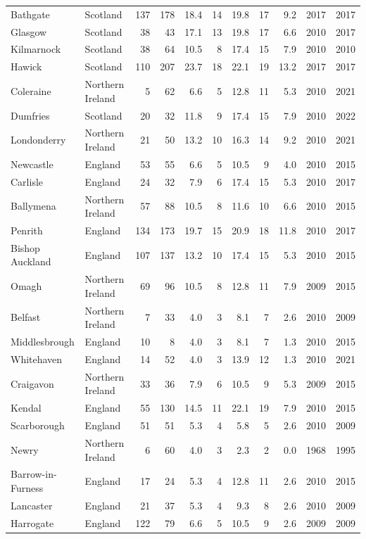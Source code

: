 \documentclass[11pt,a4paper]{article}
\begin{document}
{\begin{longtable}{llrrrrrrrrr}
Bathgate & Scotland & 137 & 178 & 18.4 & 14 & 19.8 & 17 & 9.2 & 2017 & 2017\\
Glasgow & Scotland & 38 & 43 & 17.1 & 13 & 19.8 & 17 & 6.6 & 2010 & 2017\\
Kilmarnock & Scotland & 38 & 64 & 10.5 & 8 & 17.4 & 15 & 7.9 & 2010 & 2010\\
Hawick & Scotland & 110 & 207 & 23.7 & 18 & 22.1 & 19 & 13.2 & 2017 & 2017\\
Coleraine & Northern Ireland & 5 & 62 & 6.6 & 5 & 12.8 & 11 & 5.3 & 2010 & 2021\\
Dumfries & Scotland & 20 & 32 & 11.8 & 9 & 17.4 & 15 & 7.9 & 2010 & 2022\\
Londonderry & Northern Ireland & 21 & 50 & 13.2 & 10 & 16.3 & 14 & 9.2 & 2010 & 2021\\
Newcastle & England & 53 & 55 & 6.6 & 5 & 10.5 & 9 & 4.0 & 2010 & 2015\\
Carlisle & England & 24 & 32 & 7.9 & 6 & 17.4 & 15 & 5.3 & 2010 & 2017\\
Ballymena & Northern Ireland & 57 & 88 & 10.5 & 8 & 11.6 & 10 & 6.6 & 2010 & 2015\\
Penrith & England & 134 & 173 & 19.7 & 15 & 20.9 & 18 & 11.8 & 2010 & 2017\\
Bishop Auckland & England & 107 & 137 & 13.2 & 10 & 17.4 & 15 & 5.3 & 2010 & 2015\\
Omagh & Northern Ireland & 69 & 96 & 10.5 & 8 & 12.8 & 11 & 7.9 & 2009 & 2015\\
Belfast & Northern Ireland & 7 & 33 & 4.0 & 3 & 8.1 & 7 & 2.6 & 2010 & 2009\\
Middlesbrough & England & 10 & 8 & 4.0 & 3 & 8.1 & 7 & 1.3 & 2010 & 2015\\
Whitehaven & England & 14 & 52 & 4.0 & 3 & 13.9 & 12 & 1.3 & 2010 & 2021\\
Craigavon & Northern Ireland & 33 & 36 & 7.9 & 6 & 10.5 & 9 & 5.3 & 2009 & 2015\\
Kendal & England & 55 & 130 & 14.5 & 11 & 22.1 & 19 & 7.9 & 2010 & 2015\\
Scarborough & England & 51 & 51 & 5.3 & 4 & 5.8 & 5 & 2.6 & 2010 & 2009\\
Newry & Northern Ireland & 6 & 60 & 4.0 & 3 & 2.3 & 2 & 0.0 & 1968 & 1995\\
Barrow-in-Furness & England & 17 & 24 & 5.3 & 4 & 12.8 & 11 & 2.6 & 2010 & 2015\\
Lancaster & England & 21 & 37 & 5.3 & 4 & 9.3 & 8 & 2.6 & 2010 & 2009\\
Harrogate & England & 122 & 79 & 6.6 & 5 & 10.5 & 9 & 2.6 & 2009 & 2009\\

\end{longtable}}
\end{document}
